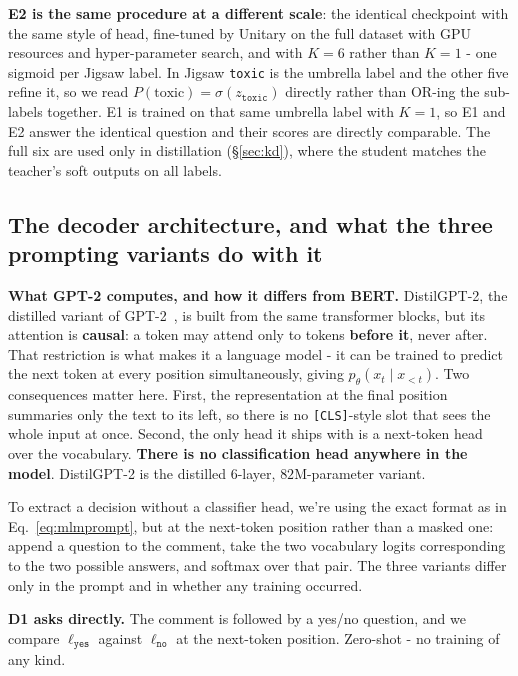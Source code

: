 \documentclass[10pt,a4paper]{article}
\begin{document}
\textbf{E2 is the same procedure at a different scale}: the identical checkpoint with the
same style of head, fine-tuned by Unitary on the full dataset with GPU resources and
hyper-parameter search, and with $K=6$ rather than $K=1$ - one sigmoid per Jigsaw label.
In Jigsaw \texttt{toxic} is the umbrella label and the other five refine it, so we read
$P(\text{toxic})=\sigma(z_{\texttt{toxic}})$ directly rather than OR-ing the sub-labels
together. E1 is trained on that same umbrella label with $K=1$, so E1 and E2 answer the
identical question and their scores are directly comparable. The full six are used only in
distillation (\S\ref{sec:kd}), where the student matches the teacher's soft outputs on all
labels.



\subsection{The decoder architecture, and what the three prompting variants do with it}

\textbf{What GPT-2 computes, and how it differs from BERT.} DistilGPT-2, the
distilled variant of GPT-2~\cite{radford2019}, is built from the
same transformer blocks, but its attention is \textbf{causal}: a token may attend only to tokens \textbf{before it}, never after. That restriction is what makes it a language model - it can
be trained to predict the next token at every position simultaneously, giving
$p_\theta(x_t \mid x_{<t})$. Two consequences matter here. First, the representation at the final position summaries only the text to its left, so there is no \texttt{[CLS]}-style
slot that sees the whole input at once. Second, the only head it ships with is a next-token head over the vocabulary. \textbf{There is no classification head anywhere in the model}. DistilGPT-2
is the distilled $6$-layer, $82$M-parameter variant.

To extract a decision without a classifier head, we're using the exact format as in
Eq.~\eqref{eq:mlmprompt}, but at the next-token position rather than a masked one: append a question to the comment, take the two vocabulary logits corresponding to the two possible answers, and softmax over that pair. The three variants differ only in the prompt and in whether any training occurred.

\textbf{D1 asks directly.} The comment is followed by a yes/no question, and we compare $\ell_{\texttt{yes}}$ against $\ell_{\texttt{no}}$ at the next-token position. Zero-shot - no training of any kind.
\end{document}
